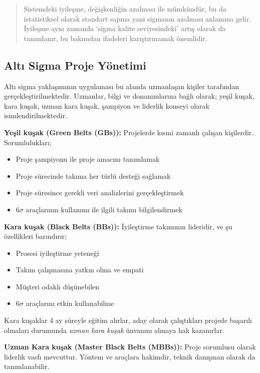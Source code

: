 \documentclass[
]{book}
\providecommand{\tightlist}{%
  \setlength{\itemsep}{0pt}\setlength{\parskip}{0pt}}
\begin{document}
\begin{quote}
Sistemdeki iyileşme, değişkenliğin azalması ile mümkündür, bu da istatistiksel olarak standart sapma yani sigmanın azalması anlamına gelir. İyileşme aynı zamanda `sigma kalite seviyesindeki' artış olarak da tanımlanır, bu bakımdan ifadeleri karıştırmamak önemlidir.
\end{quote}

\hypertarget{altux131-sigma-proje-yuxf6netimi}{%
\subsection{Altı Sigma Proje Yönetimi}\label{altux131-sigma-proje-yuxf6netimi}}

Altı sigma yaklaşımının uygulaması bu alanda uzmanlaşan kişiler tarafından gerçekleştirilmektedir. Uzmanlar, bilgi ve donanımlarına bağlı olarak; yeşil kuşak, kara kuşak, uzman kara kuşak, şampiyon ve liderlik konseyi olarak isimlendirilmektedir.

\textbf{Yeşil kuşak (Green Belts (GBs)):} Projelerde kısmi zamanlı çalışan kişilerdir. Sorumlulukları;

\begin{itemize}
\tightlist
\item
  Proje şampiyonu ile proje amacını tanımlamak
\item
  Proje sürecinde takıma her türlü desteği sağlamak
\item
  Proje süresince gerekli veri analizlerini gerçekleştirmek
\item
  6\(\sigma\) araçlarının kullanımı ile ilgili takımı bilgilendirmek
\end{itemize}

\textbf{Kara kuşak (Black Belts (BBs)):} İyileştirme takımının lideridir, ve şu özellikleri barındırır;

\begin{itemize}
\tightlist
\item
  Prosesi iyileştirme yeteneği
\item
  Takım çalışmasına yatkın olma ve empati
\item
  Müşteri odaklı düşünebilen
\item
  6\(\sigma\) araçlarını etkin kullanabilme
\end{itemize}

Kara kuşaklar 4 ay süreyle eğitim alırlar, aday olarak çalıştıkları projede başarılı olmaları durumunda \emph{uzman kara kuşak} ünvanını almaya hak kazanırlar.

\textbf{Uzman Kara kuşak (Master Black Belts (MBBs)):} Proje sorumlusu olarak liderlik vasfı mevcuttur. Yöntem ve araçlara hakimdir, teknik danışman olarak da tanımlanabilir.
\end{document}
